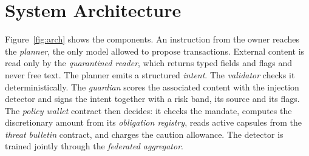 \documentclass[10pt,a4paper,twocolumn]{article}
\begin{document}
\section{System Architecture}

Figure~\ref{fig:arch} shows the components. An instruction from the owner reaches the
\emph{planner}, the only model allowed to propose transactions. External content is read
only by the \emph{quarantined reader}, which returns typed fields and flags and never
free text. The planner emits a structured \emph{intent}. The \emph{validator} checks it
deterministically. The \emph{guardian} scores the associated content with the injection
detector and signs the intent together with a risk band, its source and its flags. The
\emph{policy wallet} contract then decides: it checks the mandate, computes the
discretionary amount from its \emph{obligation registry}, reads active capsules from the
\emph{threat bulletin} contract, and charges the caution allowance. The detector is
trained jointly through the \emph{federated aggregator}.
\end{document}
